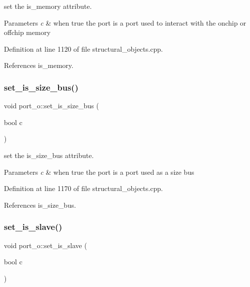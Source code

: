 set the is\+\_\+memory attribute. 


\begin{DoxyParams}{Parameters}
{\em c} & when true the port is a port used to interact with the onchip or offchip memory \\
\hline
\end{DoxyParams}


Definition at line 1120 of file structural\+\_\+objects.\+cpp.



References is\+\_\+memory.

\mbox{\label{structport__o_a6b4ec368011ad23c091231c7bb0dc48b}} 
\subsubsection{\texorpdfstring{set\+\_\+is\+\_\+size\+\_\+bus()}{set\_is\_size\_bus()}}
{\footnotesize\ttfamily void port\+\_\+o\+::set\+\_\+is\+\_\+size\+\_\+bus (\begin{DoxyParamCaption}\item[{bool}]{c }\end{DoxyParamCaption})}



set the is\+\_\+size\+\_\+bus attribute. 


\begin{DoxyParams}{Parameters}
{\em c} & when true the port is a port used as a size bus \\
\hline
\end{DoxyParams}


Definition at line 1170 of file structural\+\_\+objects.\+cpp.



References is\+\_\+size\+\_\+bus.

\mbox{\label{structport__o_ad643139da2fb1b43326122f3ad460999}} 
\subsubsection{\texorpdfstring{set\+\_\+is\+\_\+slave()}{set\_is\_slave()}}
{\footnotesize\ttfamily void port\+\_\+o\+::set\+\_\+is\+\_\+slave (\begin{DoxyParamCaption}\item[{bool}]{c }\end{DoxyParamCaption})}



